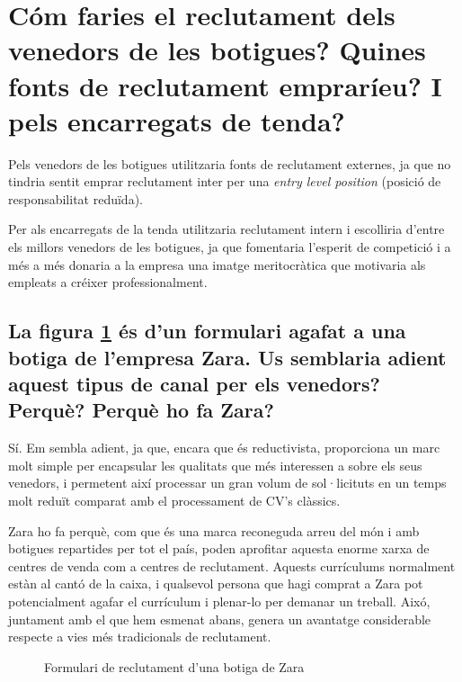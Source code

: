 \section{Cóm faries el reclutament dels venedors de les botigues? Quines fonts de reclutament empraríeu? I pels encarregats de tenda?}

Pels venedors de les botigues utilitzaria fonts de reclutament externes, ja que no tindria sentit emprar reclutament inter per una \textit{entry level position} (posició de responsabilitat reduïda).

Per als encarregats de la tenda utilitzaria reclutament intern i escolliria d'entre els millors venedors de les botigues, ja que fomentaria l'esperit de competició i a més a més donaria a la empresa una imatge meritocràtica que motivaria als empleats a créixer professionalment.

\subsection{La figura \ref{fig:zara} és d’un formulari agafat a una botiga de l’empresa Zara. Us semblaria adient aquest tipus de canal per els venedors? Perquè? Perquè ho fa Zara?}

Sí. Em sembla adient, ja que, encara que és reductivista, proporciona un marc molt simple per encapsular les qualitats que més interessen a \QnF sobre els seus venedors, i permetent així processar un gran volum de sol·licituts en un temps molt reduït comparat amb el processament de CV's clàssics.

Zara ho fa perquè, com que és una marca reconeguda arreu del món i amb botigues repartides per tot el país, poden aprofitar aquesta enorme xarxa de centres de venda com a centres de reclutament. Aquests currículums normalment estàn al cantó de la caixa, i qualsevol persona que hagi comprat a Zara pot potencialment agafar el currículum i plenar-lo per demanar un treball. Aixó, juntament amb el que hem esmenat abans, genera un avantatge considerable respecte a vies més tradicionals de reclutament.

\begin{figure}[!tbp]
  \centering
  \hfill
  \caption{Formulari de reclutament d'una botiga de Zara}
  \label{fig:zara}
\end{figure}
